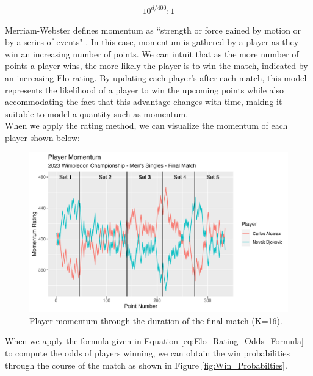 \documentclass[letterpaper, 12pt]{article}
\begin{document}
            \begin{align}
                10^{d / 400}:1 \label{eq:Elo_Rating_Odds_Formula}
            \end{align}
            
            \noindent
            Merriam-Webster defines momentum as ``strength or force gained by motion or by a series of events" \cite{MerriamWebsterMomentum}. In this case, momentum is gathered by a player as they win an increasing number of points. We can intuit that as the more number of points a player wins, the more likely the player is to win the match, indicated by an increasing Elo rating. By updating each player's after each match, this model represents the likelihood of a player to win the upcoming points while also accommodating the fact that this advantage changes with time, making it suitable to model a quantity such as momentum. \\

            \noindent
            When we apply the rating method, we can visualize the momentum of each player shown below:
            
            \begin{figure}[H]
                \centering
                \includegraphics[keepaspectratio, width = \textwidth]{Figures/Final_Match_Player_Momentum.png}
                \caption{Player momentum through the duration of the final match (K=16).}
                \label{fig:Elo_final}
            \end{figure}

            \noindent
            When we apply the formula given in Equation \ref{eq:Elo_Rating_Odds_Formula} to compute the odds of players winning, we can obtain the win probabilities through the course of the match as shown in Figure \ref{fig:Win_Probabilties}.
\end{document}
